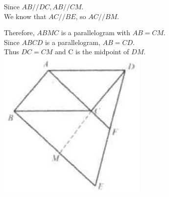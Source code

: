 \documentclass[10pt]{article}
\begin{document}
Since \(A B / / D C, A B / / C M\).\\
We know that \(A C / / B E\), so \(A C / / B M\).


Therefore, \(A B M C\) is a parallelogram with \(A B=C M\).\\
Since \(A B C D\) is a parallelogram, \(A B=C D\).\\
Thus \(D C=C M\) and C is the midpoint of \(D M\).\\
\includegraphics[max width=\textwidth, center]{2025_04_17_97bc1f7e44d93c271a88g-038(1)}
\end{document}
